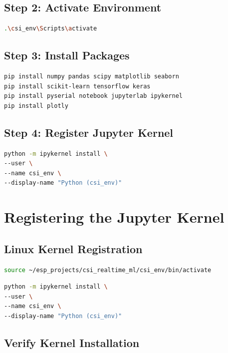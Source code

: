 \documentclass[12pt,a4paper]{article}
\begin{document}
\subsection{Step 2: Activate Environment}

\begin{lstlisting}[language=bash]
.\csi_env\Scripts\activate
\end{lstlisting}

\subsection{Step 3: Install Packages}

\begin{lstlisting}[language=bash]
pip install numpy pandas scipy matplotlib seaborn
pip install scikit-learn tensorflow keras
pip install pyserial notebook jupyterlab ipykernel
pip install plotly
\end{lstlisting}

\subsection{Step 4: Register Jupyter Kernel}

\begin{lstlisting}[language=bash]
python -m ipykernel install \
--user \
--name csi_env \
--display-name "Python (csi_env)"
\end{lstlisting}

\section{Registering the Jupyter Kernel}

\subsection{Linux Kernel Registration}

\begin{lstlisting}[language=bash]
source ~/esp_projects/csi_realtime_ml/csi_env/bin/activate
\end{lstlisting}

\begin{lstlisting}[language=bash]
python -m ipykernel install \
--user \
--name csi_env \
--display-name "Python (csi_env)"
\end{lstlisting}

\subsection{Verify Kernel Installation}
\end{document}

